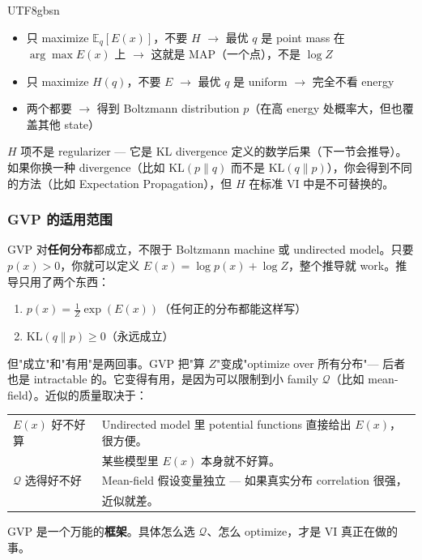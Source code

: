\documentclass[11pt]{article}
\begin{document}
\begin{CJK}{UTF8}{gbsn}
\begin{itemize}
  \item 只 maximize $\mathbb{E}_q[E(x)]$，不要 $H$ $\to$ 最优 $q$ 是 point mass 在 $\arg\max E(x)$ 上 $\to$ 这就是 MAP（一个点），不是 $\log Z$
  \item 只 maximize $H(q)$，不要 $E$ $\to$ 最优 $q$ 是 uniform $\to$ 完全不看 energy
  \item 两个都要 $\to$ 得到 Boltzmann distribution $p$（在高 energy 处概率大，但也覆盖其他 state）
\end{itemize}

$H$ 项不是 regularizer --- 它是 KL divergence 定义的数学后果（下一节会推导）。如果你换一种 divergence（比如 $\mathrm{KL}(p\|q)$ 而不是 $\mathrm{KL}(q\|p)$），你会得到不同的方法（比如 Expectation Propagation），但 $H$ 在标准 VI 中是不可替换的。

\subsubsection{GVP 的适用范围}

GVP 对\textbf{任何分布}都成立，不限于 Boltzmann machine 或 undirected model。只要 $p(x) > 0$，你就可以定义 $E(x) = \log p(x) + \log Z$，整个推导就 work。推导只用了两个东西：
\begin{enumerate}
  \item $p(x) = \frac{1}{Z}\exp(E(x))$（任何正的分布都能这样写）
  \item $\mathrm{KL}(q\|p) \geq 0$（永远成立）
\end{enumerate}

但"成立"和"有用"是两回事。GVP 把"算 $Z$"变成"optimize over 所有分布"--- 后者也是 intractable 的。它变得有用，是因为可以限制到小 family $\mathcal{Q}$（比如 mean-field）。近似的质量取决于：

\begin{center}
\begin{tabular}{l|l}
  $E(x)$ 好不好算 & Undirected model 里 potential functions 直接给出 $E(x)$，很方便。\\
  & 某些模型里 $E(x)$ 本身就不好算。\\
  \hline
  $\mathcal{Q}$ 选得好不好 & Mean-field 假设变量独立 --- 如果真实分布 correlation 很强，\\
  & 近似就差。\\
\end{tabular}
\end{center}

GVP 是一个万能的\textbf{框架}。具体怎么选 $\mathcal{Q}$、怎么 optimize，才是 VI 真正在做的事。


\end{CJK}
\end{document}
